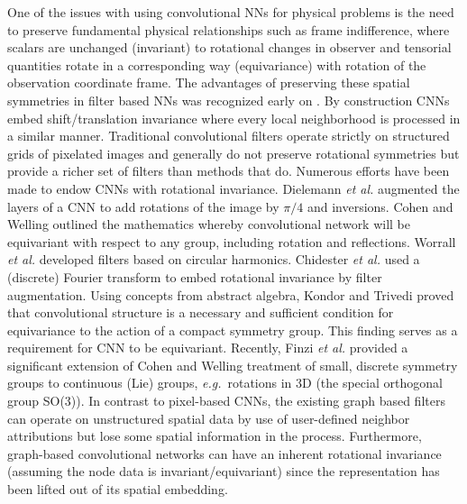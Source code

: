 \documentclass[12pt,reqno]{article}
\newcommand{\eg}{{\it e.g.}\!\, }
\newcommand{\etal}{{\it et al.} }
\begin{document}
One of the issues with using convolutional NNs for physical problems is the need to preserve fundamental physical relationships such as frame indifference, where scalars are unchanged (invariant) to rotational changes in observer and tensorial quantities rotate in a corresponding way (equivariance) with rotation of the observation coordinate frame.
The advantages of preserving these spatial symmetries in filter based NNs was recognized early on \cite{rowley1998rotation}.
By construction CNNs embed shift/translation invariance where every local neighborhood is processed in a similar manner.
Traditional convolutional filters operate strictly on structured grids of pixelated images and generally do not preserve rotational symmetries but provide a richer set of filters than methods that do.
Numerous efforts have been made to endow CNNs with rotational invariance.
Dielemann \etal \cite{dieleman2016exploiting} augmented the layers of a CNN to add rotations of the image by $\pi/4$ and inversions.
Cohen and Welling \cite{cohen2016group} outlined the mathematics whereby convolutional network will be equivariant with respect to any group, including rotation and reflections.
Worrall \etal \cite{worrall2017harmonic}  developed filters based on circular harmonics.
Chidester \etal \cite{chidester2018rotation} used a (discrete) Fourier transform to embed rotational invariance by filter augmentation.
Using concepts from abstract algebra, Kondor and Trivedi \cite{kondor2018generalization} proved that convolutional structure is a necessary and sufficient condition for equivariance to the action of a compact symmetry group.
This finding serves as a requirement for CNN to be equivariant.
Recently, Finzi \etal \cite{finzi2020generalizing} provided a significant extension of Cohen and Welling treatment of small, discrete symmetry groups to continuous (Lie) groups, \eg rotations in 3D (the special orthogonal group SO(3)).
In contrast to pixel-based CNNs, the existing graph based filters can operate on unstructured spatial data by use of user-defined neighbor attributions but lose some spatial information in the process.
Furthermore, graph-based convolutional networks can have an inherent rotational invariance (assuming the node data is invariant/equivariant) since the representation has been lifted out of its spatial embedding.
\end{document}
